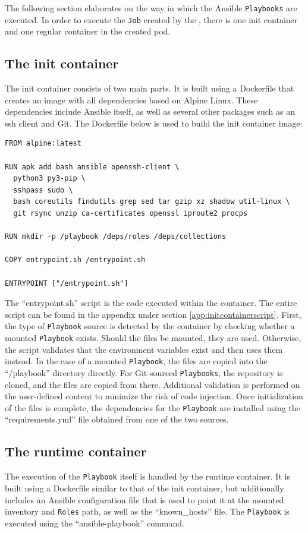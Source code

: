 The following section elaborates on the way in which the Ansible \texttt{Playbooks} are executed.
In order to execute the \texttt{Job} created by the \anrecjob, there is one init container and one regular container in the created \gls{pod}.

\subsection{The init container}
The init container consists of two main parts.
It is built using a Dockerfile that creates an image with all dependencies based on Alpine Linux.
These dependencies include Ansible itself, as well as several other packages such as an \gls{ssh} client and Git.
The Dockerfile below is used to build the init container image:

\begin{lstlisting}
FROM alpine:latest

RUN apk add bash ansible openssh-client \
  python3 py3-pip \
  sshpass sudo \
  bash coreutils findutils grep sed tar gzip xz shadow util-linux \
  git rsync unzip ca-certificates openssl iproute2 procps

RUN mkdir -p /playbook /deps/roles /deps/collections

COPY entrypoint.sh /entrypoint.sh

ENTRYPOINT ["/entrypoint.sh"]
\end{lstlisting}

The \enquote{entrypoint.sh} script is the code executed within the container.
The entire script can be found in the appendix under section \ref{app:initcontainerscript}.
First, the type of \texttt{Playbook} source is detected by the container by checking whether a mounted \texttt{Playbook} exists.
Should the files be mounted, they are used. Otherwise, the script validates that the environment variables exist and then uses them instead.
In the case of a mounted \texttt{Playbook}, the files are copied into the \enquote{/playbook} directory directly.
For Git-sourced \texttt{Playbooks}, the repository is cloned, and the files are copied from there.
Additional validation is performed on the user-defined content to minimize the risk of code injection.
Once initialization of the files is complete, the dependencies for the \texttt{Playbook} are installed using the \enquote{requirements.yml} file obtained from one of the two sources.

\subsection{The runtime container}
The execution of the \texttt{Playbook} itself is handled by the runtime container.
It is built using a Dockerfile similar to that of the init container, but additionally includes an Ansible configuration file that is used to point it at the mounted inventory and \texttt{Roles} path, as well as the \enquote{known\_hosts} file.
The \texttt{Playbook} is executed using the \enquote{ansible-playbook} command.
